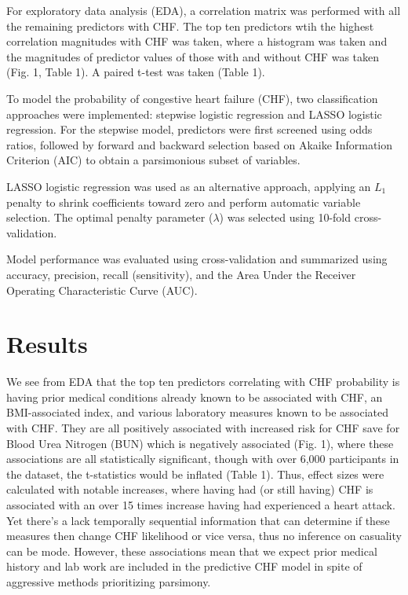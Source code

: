 \documentclass{article}
\begin{document}
For exploratory data analysis (EDA), a correlation matrix was performed with all the remaining predictors with CHF. The top ten predictors wtih the highest correlation magnitudes with CHF was taken, where a histogram was taken and the magnitudes of predictor values of those with and without CHF was taken (Fig. 1, Table 1). A paired t-test was taken (Table 1).

To model the probability of congestive heart failure (CHF), two classification approaches were implemented: stepwise logistic regression and LASSO logistic regression. For the stepwise model, predictors were first screened using odds ratios, followed by forward and backward selection based on Akaike Information Criterion (AIC) to obtain a parsimonious subset of variables.

LASSO logistic regression was used as an alternative approach, applying an $L_1$ penalty to shrink coefficients toward zero and perform automatic variable selection. The optimal penalty parameter ($\lambda$) was selected using 10-fold cross-validation.

Model performance was evaluated using cross-validation and summarized using accuracy, precision, recall (sensitivity), and the Area Under the Receiver Operating Characteristic Curve (AUC).
\vspace{-1em}
\section*{Results}
\vspace{-6mm}

We see from EDA that the top ten predictors correlating with CHF probability is having prior medical conditions already known to be associated with CHF, an BMI-associated index, and various laboratory measures known to be associated with CHF. They are all positively associated with increased risk for CHF save for Blood Urea Nitrogen (BUN) which is negatively associated (Fig. 1), where these associations are all statistically significant, though with over 6,000 participants in the dataset, the t-statistics would be inflated (Table 1). Thus, effect sizes were calculated with notable increases, where having had (or still having) CHF is associated with an over 15 times increase having had experienced a heart attack. Yet there's a lack temporally sequential information that can determine if these measures then change CHF likelihood or vice versa, thus no inference on casuality can be mode. However, these associations mean that we expect prior medical history and lab work are included in the predictive CHF model in spite of aggressive methods prioritizing parsimony.
\end{document}

